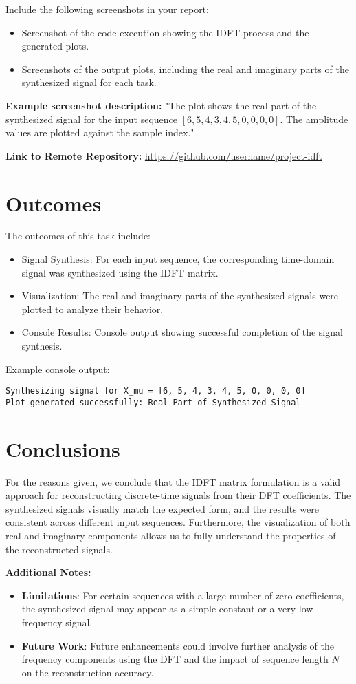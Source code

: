 \documentclass[12pt]{article}
\begin{document}
Include the following screenshots in your report:
\begin{itemize}
    \item Screenshot of the code execution showing the IDFT process and the generated plots.
    \item Screenshots of the output plots, including the real and imaginary parts of the synthesized signal for each task.
\end{itemize}

\textbf{Example screenshot description:} "The plot shows the real part of the synthesized signal for the input sequence \( [6, 5, 4, 3, 4, 5, 0, 0, 0, 0] \). The amplitude values are plotted against the sample index."

\textbf{Link to Remote Repository:} \url{https://github.com/username/project-idft}

\section{Outcomes}

The outcomes of this task include:
\begin{itemize}
    \item Signal Synthesis: For each input sequence, the corresponding time-domain signal was synthesized using the IDFT matrix.
    \item Visualization: The real and imaginary parts of the synthesized signals were plotted to analyze their behavior.
    \item Console Results: Console output showing successful completion of the signal synthesis.
\end{itemize}

Example console output:
\begin{verbatim}
Synthesizing signal for X_mu = [6, 5, 4, 3, 4, 5, 0, 0, 0, 0]
Plot generated successfully: Real Part of Synthesized Signal
\end{verbatim}

\section{Conclusions}

For the reasons given, we conclude that the IDFT matrix formulation is a valid approach for reconstructing discrete-time signals from their DFT coefficients. The synthesized signals visually match the expected form, and the results were consistent across different input sequences. Furthermore, the visualization of both real and imaginary components allows us to fully understand the properties of the reconstructed signals.

\textbf{Additional Notes:}
\begin{itemize}
    \item \textbf{Limitations}: For certain sequences with a large number of zero coefficients, the synthesized signal may appear as a simple constant or a very low-frequency signal.
    \item \textbf{Future Work}: Future enhancements could involve further analysis of the frequency components using the DFT and the impact of sequence length \( N \) on the reconstruction accuracy.
\end{itemize}
\end{document}
